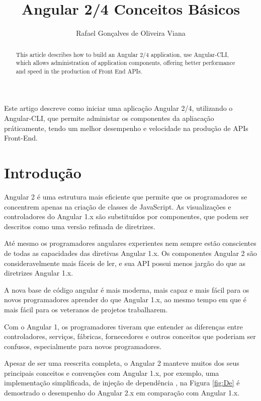 \documentclass[12pt]{article}
\title{Angular 2/4 Conceitos Básicos}
\author{Rafael Gonçalves de Oliveira Viana\inst{1} }
\begin{document}
 

\maketitle

\begin{abstract}
This article describes how to build an Angular 2/4 application, use Angular-CLI, which allows administration of application components, offering better performance and speed in the production of Front End APIs.
\end{abstract}
     
\begin{resumo} 
  Este artigo descreve como iniciar uma aplicação Angular 2/4, utilizando o Angular-CLI, que permite administar os componentes da apliacação práticamente, tendo um melhor desempenho e velocidade na produção de APIs Front-End. 
\end{resumo}


\section{Introdução}

Angular 2 é uma estrutura mais eficiente que permite que os programadores se concentrem apenas na criação de classes de JavaScript. As visualizações e controladores do Angular 1.x são substituídos por componentes, que podem ser descritos como uma versão refinada de diretrizes.

Até mesmo os programadores angulares experientes nem sempre estão conscientes de todas as capacidades das diretivas Angular 1.x. Os componentes Angular 2 são consideravelmente mais fáceis de ler, e sua API possui menos jargão do que as diretrizes Angular 1.x.

A nova base de código angular é mais moderna, mais capaz e mais fácil para os novos programadores aprender do que Angular 1.x, ao mesmo tempo em que é mais fácil para os veteranos de projetos trabalharem.

Com o Angular 1, os programadores tiveram que entender as diferenças entre controladores, serviços, fábricas, fornecedores e outros conceitos que poderiam ser confusos, especialmente para novos programadores.

Apesar de ser uma reescrita completa, o Angular 2 manteve muitos dos seus principais conceitos e convenções com Angular 1.x, por exemplo, uma implementação simplificada, de injeção de dependência \cite{ehrenfeucht1992angular}, na Figura \ref{fig:De} é demostrado o desempenho do Angular 2.x em comparação com Angular 1.x. 
\end{document}
